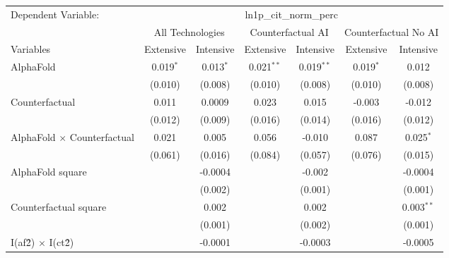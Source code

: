 \begingroup
\centering
\begin{tabular}{lcccccc}
   \tabularnewline \midrule \midrule
   Dependent Variable: & \multicolumn{6}{c}{ln1p\_cit\_norm\_perc}\\
 & \multicolumn{2}{c}{All Technologies} & \multicolumn{2}{c}{Counterfactual AI} & \multicolumn{2}{c}{Counterfactual No AI} \\
\cmidrule(lr){1-1}\cmidrule(lr){2-3} \cmidrule(lr){4-5} \cmidrule(lr){6-7}
Variables & \multicolumn{1}{c}{Extensive} & \multicolumn{1}{c}{Intensive} & \multicolumn{1}{c}{Extensive} & \multicolumn{1}{c}{Intensive} & \multicolumn{1}{c}{Extensive} & \multicolumn{1}{c}{Intensive} \\
\cmidrule(lr){1-1}\cmidrule(lr){2-2} \cmidrule(lr){3-3} \cmidrule(lr){4-4} \cmidrule(lr){5-5} \cmidrule(lr){6-6} \cmidrule(lr){7-7}
   AlphaFold                          & 0.019$^{*}$ & 0.013$^{*}$ & 0.021$^{**}$ & 0.019$^{**}$ & 0.019$^{*}$ & 0.012\\   
                                      & (0.010)     & (0.008)     & (0.010)      & (0.008)      & (0.010)     & (0.008)\\   
   Counterfactual                     & 0.011       & 0.0009      & 0.023        & 0.015        & -0.003      & -0.012\\   
                                      & (0.012)     & (0.009)     & (0.016)      & (0.014)      & (0.016)     & (0.012)\\   
   AlphaFold $\times$ Counterfactual  & 0.021       & 0.005       & 0.056        & -0.010       & 0.087       & 0.025$^{*}$\\   
                                      & (0.061)     & (0.016)     & (0.084)      & (0.057)      & (0.076)     & (0.015)\\   
   AlphaFold square                   &             & -0.0004     &              & -0.002       &             & -0.0004\\   
                                      &             & (0.002)     &              & (0.001)      &             & (0.001)\\   
   Counterfactual square              &             & 0.002       &              & 0.002        &             & 0.003$^{**}$\\   
                                      &             & (0.001)     &              & (0.002)      &             & (0.001)\\   
   I(af\^2) $\times$ I(ct\^2)         &             & -0.0001     &              & -0.0003      &             & -0.0005\\   

\end{tabular}
